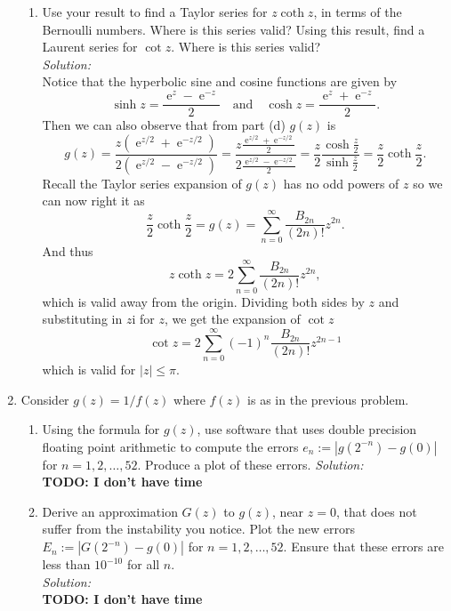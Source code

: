 \documentclass[10pt]{amsart}
\newcommand{\I}{\mathrm{i}}
\DeclareMathOperator{\E}{e}
\theoremstyle{nonumberplain}
\begin{document}
\begin{enumerate}[label={\bf {\arabic*}:}]
\begin{enumerate}
\item Use your result to find a Taylor series for $z \operatorname{coth} z$, in terms of the Bernoulli numbers. Where is this series valid? Using this result, find a Laurent series for $\cot z$. Where is this series valid?  \\
\textit{Solution:} \\
Notice that the hyperbolic sine and cosine functions are given by
$$ 
\sinh z = \frac{\E^z - \E^{-z}}{2} \quad\text{and}\quad \cosh z =  \frac{\E^z + \E^{-z}}{2}.
$$
Then we can also observe that from part (d) $g(z)$ is 
$$
g(z) = \frac {z(\E^{z/2} +\E^{-z/2})} {2(\E^{z/2} - \E^{-z/2})}
	= \frac {z\frac{\E^{z/2} +\E^{-z/2}}{2}} {2\frac{\E^{z/2} - \E^{-z/2}}{2}}
	= \frac {z}{2} \frac{\cosh \frac z 2} {\sinh \frac z 2}
	= \frac {z}{2} \coth \frac z 2.
$$
Recall the Taylor series expansion of $g(z)$ has no odd powers of $z$ so we can now right it as
$$
\frac {z}{2} \coth \frac z 2 = g(z) = \sum_{n=0}^\infty \frac{B_{2n}}{(2n)!}z^{2n}.
$$
And thus
$$
z \coth z = 2\sum_{n=0}^\infty \frac{B_{2n}}{(2n)!}z^{2n},
$$
which is valid away from the origin.
Dividing both sides by $z$ and substituting in $z\I$ for $z$, we get the expansion of $\cot z$
$$
\cot z = 2\sum_{n=0}^\infty (-1)^n \frac{B_{2n}}{(2n)!}z^{2n - 1}
$$
which is valid for $|z| \leq \pi$.
\end{enumerate}
\newpage

\item Consider $g(z) = 1/f(z)$ where $f(z)$ is as in the previous
  problem.
  \begin{enumerate}
  \item Using the formula for $g(z)$, use software that uses double
    precision floating point arithmetic to compute the errors $e_n:=
    |g(2^{-n}) - g(0)|$ for $n= 1,2,\ldots, 52$.  Produce a plot of
    these errors.
\textit{Solution:} \\
\textbf{TODO: I don't have time} \\

  \item Derive an approximation $G(z)$ to $g(z)$, near $z = 0$, that does not suffer
    from the instability you notice.  Plot the new errors $E_n:=
    |G(2^{-n}) - g(0)|$ for $n= 1,2,\ldots, 52$.  Ensure that these
    errors are less than $10^{-10}$ for all $n$.\\
\textit{Solution:} \\
\textbf{TODO: I don't have time} \\
\end{enumerate}
\newpage


\end{enumerate}
\end{document}
